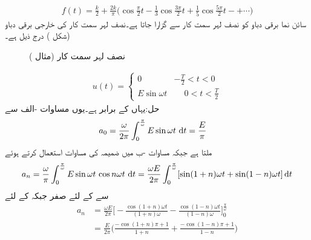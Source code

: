 \begin{align*}
f(t)=\frac{k}{2}+\frac{2k}{\pi}\big(\cos \frac{\pi}{2}t-\frac{1}{3}\cos \frac{3\pi}{2}t+\frac{1}{5}\cos \frac{5\pi}{2}t-+\cdots\big)
\end{align*}
\quad سائن نما برقی دباو  کو نصف لہر سمت کار سے گزارا جاتا ہے۔نصف لہر سمت کار کی خارجی برقی دباو  (شکل ) درج ذیل ہے۔
\begin{figure}
\centering
{}
\caption{نصف لہر سمت کار (مثال )}
\label{شکل_مثال_فوریئر_نصف_لہر_سمت_کار}
\end{figure}
%
 \begin{align*}
u(t)=
\begin{cases}
0&-\frac{T}{2}<t<0\\
E\sin \omega t&\phantom{-}0<t<\frac{T}{2}
\end{cases}
\end{align*}
حل:یہاں  کے برابر ہے۔یوں مساوات -الف سے
\begin{align*}
a_0&=\frac{\omega}{2\pi}\int_{0}^{\frac{\pi}{\omega}} E\sin \omega t\, \dif t=\frac{E}{\pi}
\end{align*}
ملتا ہے جبکہ مساوات -ب میں ضمیمہ  کی مساوات  استعمال کرتے ہوئے
\begin{align*}
a_n=\frac{\omega}{\pi}\int_0^{\frac{\pi}{\omega}} E\sin \omega t\,\cos n\omega t\,\dif t=\frac{\omega E}{2\pi}\int_0^{\frac{\pi}{\omega}} [\sin(1+n)\omega t+\sin(1-n)\omega t]\dif t
\end{align*}
سے  کے لئے صفر جبکہ  کے لئے
\begin{align*}
a_n&=\frac{\omega E}{2\pi}\big[-\frac{\cos(1+n)\omega t}{(1+n)\omega}-\frac{\cos(1-n)\omega t}{(1-n)\omega}\big]_{0}^{\frac{\pi}{\omega}}\\
&=\frac{E}{2\pi}\big(\frac{-\cos(1+n)\pi+1}{1+n}+\frac{-\cos(1-n)\pi+1}{1-n}\big)
\end{align*}
